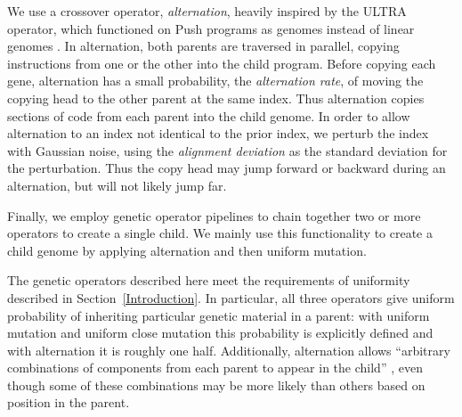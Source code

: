 \documentclass[graybox]{svmult}
\begin{document}
We use a crossover operator, \textit{alternation}, heavily inspired by the ULTRA operator, which functioned on Push programs as genomes instead of linear genomes \cite{Spector:2013:GPTP}. In alternation, both parents are traversed in parallel, copying instructions from one or the other into the child program. Before copying each gene, alternation has a small probability, the \textit{alternation rate}, of moving the copying head to the other parent at the same index. Thus alternation copies sections of code from each parent into the child genome. In order to allow alternation to an index not identical to the prior index, we perturb the index with Gaussian noise, using the \textit{alignment deviation} as the standard deviation for the perturbation. Thus the copy head may jump forward or backward during an alternation, but will not likely jump far.

Finally, we employ genetic operator pipelines to chain together two or more operators to create a single child. We mainly use this functionality to create a child genome by applying alternation and then uniform mutation.

The genetic operators described here meet the requirements of uniformity described in Section~\ref{Introduction}. In particular, all three operators give uniform probability of inheriting particular genetic material in a parent: with uniform mutation and uniform close mutation this probability is explicitly defined and with alternation it is roughly one half. Additionally, alternation allows ``arbitrary combinations of components from each parent to appear in the child'' \cite{Spector:2013:GPTP}, even though some of these combinations may be more likely than others based on position in the parent.




\end{document}
